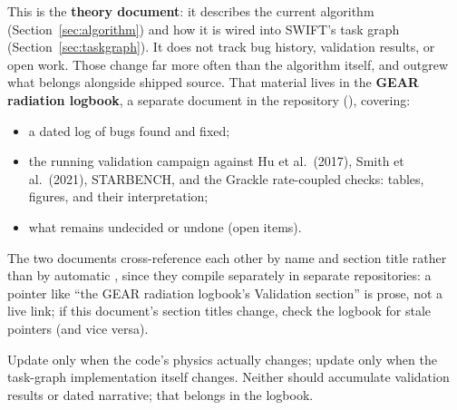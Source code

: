 This is the \textbf{theory document}: it describes the current
algorithm (Section~\ref{sec:algorithm}) and how it is wired into
SWIFT's task graph (Section~\ref{sec:taskgraph}). It does not
track bug history, validation results, or open work. Those change
far more often than the algorithm itself, and outgrew what belongs
alongside shipped source. That material lives in the \textbf{GEAR
radiation logbook}, a separate document in the 
repository (), covering:
\begin{itemize}
  \item a dated log of bugs found and fixed;
  \item the running validation campaign against Hu et al.\ (2017),
    Smith et al.\ (2021), STARBENCH, and the Grackle rate-coupled
    checks: tables, figures, and their interpretation;
  \item what remains undecided or undone (open items).
\end{itemize}
The two documents cross-reference each other by name and section
title rather than by automatic , since they
compile separately in separate repositories: a pointer like ``the
GEAR radiation logbook's Validation section'' is prose, not a live
link; if this document's section titles change, check the logbook for
stale pointers (and vice versa).

Update  only when the code's physics actually
changes; update  only when the task-graph
implementation itself changes. Neither should accumulate validation
results or dated narrative; that belongs in the logbook.
